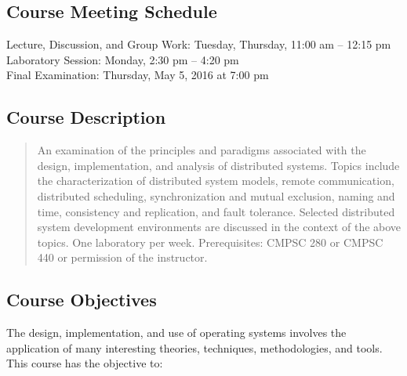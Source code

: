 \subsection*{Course Meeting Schedule}

Lecture, Discussion, and Group Work: Tuesday, Thursday, 11:00 am -- 12:15 pm\\
Laboratory Session: Monday, 2:30 pm -- 4:20 pm \\
Final Examination: Thursday, May 5, 2016 at 7:00 pm

\subsection*{Course Description}

\begin{quote}

An examination of the principles and paradigms associated with the design, implementation, and analysis of distributed
systems. Topics include the characterization of distributed system models, remote communication, distributed scheduling,
synchronization and mutual exclusion, naming and time, consistency and replication, and fault tolerance. Selected
distributed system development environments are discussed in the context of the above topics. One laboratory per week.
Prerequisites: CMPSC 280 or CMPSC 440 or permission of the instructor.

\end{quote}

\subsection*{Course Objectives}

The design, implementation, and use of operating systems involves the application of many interesting
theories, techniques, methodologies, and tools.  This course has the objective to:

